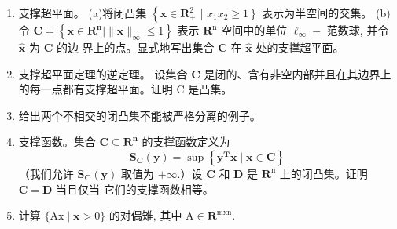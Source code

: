 \documentclass[handout]{beamer}
\begin{document}
\begin{frame}[allowframebreaks]
\begin{enumerate}
 \item   支撑超平面。
(a)将闭凸集 $\left\{\mathbf{x} \in \mathbf{R}_{+}^{2}\right.$ | $\left.x_{1} x_{2} \geq 1\right\}$ 表示为半空间的交集。
(b)令 $\mathbf{C}=\left\{\mathbf{x} \in \mathbf{R}^{\mathbf{n}} \mid\|\mathbf{x}\|_{\infty} \leq 1\right\}$ 表示 $\mathbf{R}^{\mathrm{n}}$ 空间中的单位 $\ell_{\infty}-$ 范数球, 并令 $\hat{\mathbf{x}}$ 为 $\mathbf{C}$ 的边 界上的点。显式地写出集合 $\mathbf{C}$ 在 $\hat{\mathbf{x}}$ 处的支撑超平面。
 \item  支撑超平面定理的逆定理。
设集合 $\mathbf{C}$ 是闭的、含有非空内部并且在其边界上的每一点都有支撑超平面。证明 C 是凸集。
 \item   给出两个不相交的闭凸集不能被严格分离的例子。
 \item  支撑函数。集合 $\mathbf{C} \subseteq \mathbf{R}^{\mathbf{n}}$ 的支撑函数定义为
$$
\mathbf{S}_{\mathbf{C}}(\mathbf{y})=\sup \left\{\mathbf{y}^{\mathbf{T}} \mathbf{x} \mid \mathbf{x} \in \mathbf{C}\right\}
$$
（我们允许 $\mathbf{S}_{\mathbf{C}}(\mathbf{y})$ 取值为 $+\infty$.）设 $\mathbf{C}$ 和 $\mathbf{D}$ 是 $\mathbf{R}^{\mathrm{n}}$ 上的闭凸集。证明 $\mathbf{C}=\mathbf{D}$ 当且仅当 它们的支撑函数相等。

   \item 计算  $\{\mathrm{Ax} \mid \mathbf{x}>0\} \text { 的对偶雉, 其中 } \mathrm{A} \in \mathbf{R}^{\mathrm{mxn}} \text {. }$
  \end{enumerate}

\end{frame}



\end{document}
